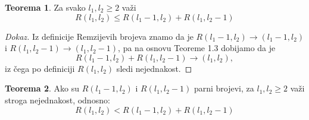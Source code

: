 \documentclass{article}
\theoremstyle{definition}
\newtheorem{teorema}{Teorema}[section]
\newcommand{\dokaz}[1]{\begin{proof}[Dokaz]#1\end{proof}}
\begin{document}
	\begin{teorema}
		Za svako $l_1,l_2 \geq 2$ važi
		\[
		R(l_1,l_2) \leq R(l_1-1, l_2) + R(l_1, l_2-1)
		\]
	\end{teorema}
	\dokaz{
		Iz definicije Remzijevih brojeva znamo da je $R(l_1 - 1,l_2) \rightarrow (l_1 - 1, l_2)$ i $R(l_1, l_2 - 1) \rightarrow (l_1, l_2 - 1)$, pa na osnovu
		Teoreme 1.3 dobijamo da je $$R(l_1 - 1,l_2) + R(l_1, l_2 - 1) \rightarrow (l_1,l_2),$$ iz čega po definiciji $R(l_1,l_2)$ sledi nejednakost.
	}

	\begin{teorema}
		Ako su  $R(l_1 - 1, l_2)$ i $R(l_1, l_2 - 1)$ parni brojevi, za $l_1,l_2 \geq 2$ važi stroga nejednakost, odnosno: 
		\[
		R(l_1,l_2) < R(l_1-1, l_2) + R(l_1, l_2-1)
		\]
	\end{teorema}
\end{document}
